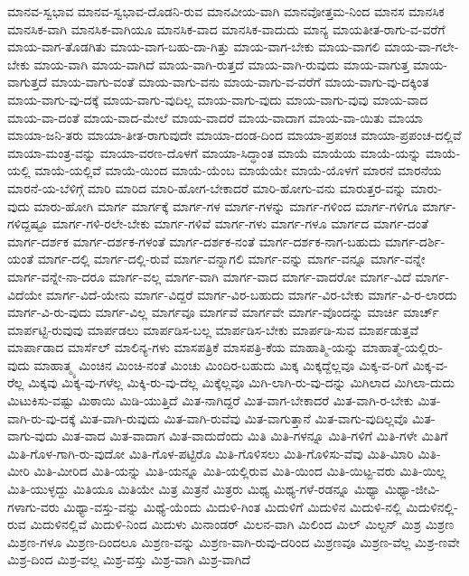 {ಮಾನವ-ಸ್ವಭಾವ
ಮಾನವ-ಸ್ವಭಾವ-ದೊಡನಿ-ರುವ
ಮಾನವೀಯ-ವಾಗಿ
ಮಾನವೋತ್ತಮ-ನಿಂದ
ಮಾನಸ
ಮಾನಸಿಕ
ಮಾನಸಿಕ-ವಾಗಿ
ಮಾನಸಿಕ-ವಾಗಿಯೂ
ಮಾನಸಿಕ-ವಾದ
ಮಾನಸಿಕ-ವಾದುದು
ಮಾನ್ಯ
ಮಾಯತೀತ-ರಾಗು-ವ-ವರೆಗೆ
ಮಾಯ-ವಾಗ-ತೊಡಗಿತು
ಮಾಯ-ವಾಗ-ಬಹು-ದಾ-ಗಿತ್ತು
ಮಾಯ-ವಾಗ-ಬೇಕು
ಮಾಯ-ವಾಗಲಿ
ಮಾಯ-ವಾ-ಗಲೇ-ಬೇಕು
ಮಾಯ-ವಾಗಿ
ಮಾಯ-ವಾಗಿದೆ
ಮಾಯ-ವಾಗಿ-ರುತ್ತದೆ
ಮಾಯ-ವಾಗಿ-ರುವುದು
ಮಾಯ-ವಾಗುತ್ತ
ಮಾಯ-ವಾಗುತ್ತದೆ
ಮಾಯ-ವಾಗು-ವಂತೆ
ಮಾಯ-ವಾಗು-ವನು
ಮಾಯ-ವಾಗು-ವ-ವರೆಗೆ
ಮಾಯ-ವಾಗು-ವು-ದಕ್ಕಿಂತ
ಮಾಯ-ವಾಗು-ವು-ದಕ್ಕೆ
ಮಾಯ-ವಾಗು-ವುದಿಲ್ಲ
ಮಾಯ-ವಾಗು-ವುದು
ಮಾಯ-ವಾಗು-ವುವು
ಮಾಯ-ವಾದ
ಮಾಯ-ವಾ-ದಂತೆ
ಮಾಯ-ವಾದ-ಮೇಲೆ
ಮಾಯ-ವಾದರೆ
ಮಾಯ-ವಾದಾಗ
ಮಾಯ-ವಾ-ಯಿತು
ಮಾಯಾ
ಮಾಯಾ-ಜನಿ-ತರು
ಮಾಯಾ-ತೀತ-ರಾಗುವುದೇ
ಮಾಯಾ-ದಂಡ-ದಿಂದ
ಮಾಯಾ-ಪ್ರಪಂಚ
ಮಾಯಾ-ಪ್ರಪಂಚ-ದಲ್ಲಿವೆ
ಮಾಯಾ-ಮಂತ್ರ-ವನ್ನು
ಮಾಯಾ-ವರಣ-ದೊಳಗೆ
ಮಾಯಾ-ಸಿದ್ಧಾಂತ
ಮಾಯೆ
ಮಾಯೆಯ
ಮಾಯೆ-ಯನ್ನು
ಮಾಯೆ-ಯಲ್ಲಿ
ಮಾಯೆ-ಯಲ್ಲಿವೆ
ಮಾಯೆ-ಯಿಂದ
ಮಾಯೆ-ಯೆಂಬ
ಮಾಯೆಯೇ
ಮಾಯೆ-ಯೊಳಗೆ
ಮಾರನೆ
ಮಾರನೆಯ
ಮಾರನೆ-ಯ-ಬೆಳಿಗ್ಗೆ
ಮಾರಿ
ಮಾರಿದ
ಮಾರಿ-ಹೋಗ-ಬೇಕಾದರೆ
ಮಾರಿ-ಹೋಗು-ವನು
ಮಾರುತ್ತರ-ವನ್ನು
ಮಾರು-ವುದು
ಮಾರು-ಹೋಗಿ
ಮಾರ್ಗ
ಮಾರ್ಗಕ್ಕೆ
ಮಾರ್ಗ-ಗಳ
ಮಾರ್ಗ-ಗಳನ್ನು
ಮಾರ್ಗ-ಗಳಿಂದ
ಮಾರ್ಗ-ಗಳಿಗೂ
ಮಾರ್ಗ-ಗಳಿದ್ದಷ್ಟೂ
ಮಾರ್ಗ-ಗಳಿ-ರಲೇ-ಬೇಕು
ಮಾರ್ಗ-ಗಳಿವೆ
ಮಾರ್ಗ-ಗಳು
ಮಾರ್ಗ-ಗಳೂ
ಮಾರ್ಗದ
ಮಾರ್ಗ-ದಂತೆ
ಮಾರ್ಗ-ದರ್ಶಕ
ಮಾರ್ಗ-ದರ್ಶಕ-ಗಳಂತೆ
ಮಾರ್ಗ-ದರ್ಶಕ-ನಂತೆ
ಮಾರ್ಗ-ದರ್ಶಕ-ನಾಗ-ಬಹುದು
ಮಾರ್ಗ-ದರ್ಶಿ-ಯಂತೆ
ಮಾರ್ಗ-ದಲ್ಲಿ
ಮಾರ್ಗ-ದಲ್ಲಿ-ರುವೆ
ಮಾರ್ಗ-ವನ್ನಾಗಲಿ
ಮಾರ್ಗ-ವನ್ನು
ಮಾರ್ಗ-ವನ್ನೂ
ಮಾರ್ಗ-ವನ್ನೇ
ಮಾರ್ಗ-ವನ್ನೇ-ನಾ-ದರೂ
ಮಾರ್ಗ-ವಲ್ಲ
ಮಾರ್ಗ-ವಾಗಿ
ಮಾರ್ಗ-ವಾದ
ಮಾರ್ಗ-ವಾದರೋ
ಮಾರ್ಗ-ವಿದೆ
ಮಾರ್ಗ-ವಿದೆಯೇ
ಮಾರ್ಗ-ವಿದೆ-ಯೇನು
ಮಾರ್ಗ-ವಿದ್ದರೆ
ಮಾರ್ಗ-ವಿರ-ಬಹುದು
ಮಾರ್ಗ-ವಿರ-ಬೇಕು
ಮಾರ್ಗ-ವಿ-ರ-ಲಾರದು
ಮಾರ್ಗ-ವಿ-ರು-ವುದು
ಮಾರ್ಗ-ವಿಲ್ಲ
ಮಾರ್ಗವೂ
ಮಾರ್ಗವೆ
ಮಾರ್ಗವೇ
ಮಾರ್ಗ-ವೊಂದನ್ನು
ಮಾರ್ಚಿ
ಮಾರ್ಚ್
ಮಾರ್ಪಟ್ಟಿ-ರುವುವು
ಮಾರ್ಪಡಲು
ಮಾರ್ಪಡಿಸ-ಬಲ್ಲ
ಮಾರ್ಪಡಿಸ-ಬೇಕು
ಮಾರ್ಪಡಿ-ಸುವ
ಮಾರ್ಪಡುತ್ತವೆ
ಮಾರ್ಪಾಡಾದ
ಮಾರ್ಸೆಲ್
ಮಾಲಿನ್ಯ-ಗಳು
ಮಾಸಪತ್ರಿಕೆ
ಮಾಸಪತ್ರಿ-ಕೆಯ
ಮಾಹಾತ್ಮಿ-ಯನ್ನು
ಮಾಹಾತ್ಮೆ-ಯಲ್ಲಿರು-ವುದು
ಮಾಹಾತ್ಮ್ಯ
ಮಿಂಚಿನ
ಮಿಂಚಿ-ನಂತೆ
ಮಿಂಚು
ಮಿಂದಿರ-ಬಹುದು
ಮಿಕ್ಕ
ಮಿಕ್ಕದ್ದೆಲ್ಲವೂ
ಮಿಕ್ಕ-ವ-ರಿಗೆ
ಮಿಕ್ಕ-ವ-ರೆಲ್ಲ
ಮಿಕ್ಕವು
ಮಿಕ್ಕ-ವು-ಗಳೆಲ್ಲ
ಮಿಕ್ಕಿ-ರು-ವು-ದೆಲ್ಲ
ಮಿಕ್ಕೆಲ್ಲವೂ
ಮಿಗಿ-ಲಾಗಿ-ರು-ವು-ದನ್ನು
ಮಿಗಿಲಾದ
ಮಿಗಿಲಾ-ದುದು
ಮಿಟುಕಿಸು-ವಷ್ಟು
ಮಿಠಾಯಿ
ಮಿಡಿ-ಯುತ್ತಿದೆ
ಮಿತ-ನಾಗಿದ್ದರೆ
ಮಿತ-ವಾಗ-ಬೇಕಾದರೆ
ಮಿತ-ವಾಗಿ-ರ-ಬೇಕು
ಮಿತ-ವಾಗಿ-ರು-ವು-ದಕ್ಕೆ
ಮಿತ-ವಾಗಿ-ರುವುದು
ಮಿತ-ವಾಗಿ-ರುವೆವು
ಮಿತ-ವಾಗುತ್ತಾನೆ
ಮಿತ-ವಾಗು-ವುದಿಲ್ಲವೊ
ಮಿತ-ವಾಗು-ವುದು
ಮಿತ-ವಾದ
ಮಿತ-ವಾದಾಗ
ಮಿತ-ವಾದುದೆಂದು
ಮಿತಿ
ಮಿತಿ-ಗಳನ್ನೂ
ಮಿತಿ-ಗಳಿಗೆ
ಮಿತಿ-ಗಳೇ
ಮಿತಿಗೆ
ಮಿತಿ-ಗೊಳ-ಗಾಗಿ-ರು-ವುದೋ
ಮಿತಿ-ಗೊಳ-ಪಟ್ಟಿರೊ
ಮಿತಿ-ಗೊಳಿಸಲು
ಮಿತಿ-ಗೊಳಿಸು-ವೆವು
ಮಿತಿ-ಮಿಾರಿ
ಮಿತಿ-ಮೀರಿ
ಮಿತಿ-ಮೀರಿದ
ಮಿತಿ-ಯನ್ನು
ಮಿತಿ-ಯನ್ನೂ
ಮಿತಿ-ಯಲ್ಲಿರುವ
ಮಿತಿ-ಯಿಂದ
ಮಿತಿ-ಯಿಟ್ಟ-ವರು
ಮಿತಿ-ಯಿಲ್ಲ
ಮಿತಿ-ಯುಳ್ಳದ್ದು
ಮಿತಿಯೂ
ಮಿತಿಯೇ
ಮಿತ್ರ
ಮಿತ್ರನೆ
ಮಿತ್ರರು
ಮಿಥ್ಯ
ಮಿಥ್ಯ-ಗಳೆ-ರಡನ್ನೂ
ಮಿಥ್ಯಾ
ಮಿಥ್ಯಾ-ಜೀವಿ-ಗಳಾಗು-ವರು
ಮಿಥ್ಯಾ-ವಸ್ತು-ವನ್ನು
ಮಿಥ್ಯೆ-ಯೆಂದು
ಮಿದುಳಿ-ಗಿಂತ
ಮಿದುಳಿಗೆ
ಮಿದುಳಿನ
ಮಿದುಳಿ-ನಲ್ಲಿ
ಮಿದುಳಿನಲ್ಲಿ-ರುವ
ಮಿದುಳಿನಲ್ಲಿವೆ
ಮಿದುಳಿ-ನಿಂದ
ಮಿದುಳು
ಮಿನಾಂಡರ್
ಮಿಲನ-ವಾಗಿ
ಮಿಲಿಂದ
ಮಿಲ್
ಮಿಲ್ಟನ್
ಮಿಶ್ರ
ಮಿಶ್ರಣ
ಮಿಶ್ರಣ-ಗಳೂ
ಮಿಶ್ರಣ-ದಿಂದಲೂ
ಮಿಶ್ರಣ-ವನ್ನು
ಮಿಶ್ರಣ-ವಾಗಿ-ರುವು-ದರಿಂದ
ಮಿಶ್ರಣವೂ
ಮಿಶ್ರಣ-ವೆಲ್ಲ
ಮಿಶ್ರ-ಣವೇ
ಮಿಶ್ರ-ದಿಂದ
ಮಿಶ್ರ-ವಲ್ಲ
ಮಿಶ್ರ-ವಸ್ತು
ಮಿಶ್ರ-ವಾಗಿ
ಮಿಶ್ರ-ವಾಗಿದೆ
}
